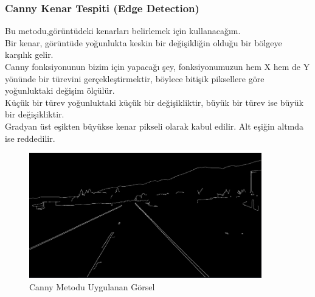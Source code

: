 \documentclass{article}
\begin{document}
\subsubsection{Canny Kenar Tespiti (Edge Detection)}
Bu metodu,görüntüdeki kenarları belirlemek için kullanacağım.\\[2pt]
Bir kenar, görüntüde yoğunlukta keskin bir değişikliğin olduğu bir bölgeye karşılık gelir.\\[2pt]
Canny fonksiyonunun bizim için yapacağı şey, fonksiyonumuzun hem X hem de Y yönünde bir türevini gerçekleştirmektir, böylece bitişik piksellere göre yoğunluktaki değişim ölçülür.\\[2pt]
Küçük bir türev yoğunluktaki küçük bir değişikliktir, büyük bir türev ise büyük bir değişikliktir.\\[2pt]
Gradyan üst eşikten büyükse kenar pikseli olarak kabul edilir. Alt eşiğin altında ise reddedilir.\\[5pt]
\begin{figure}[h]
  \centering
  \includegraphics[width=0.9\textwidth]{image/Resim23.png} %
  \caption{Canny Metodu Uygulanan Görsel}
  \label{fig:python21}  
\end{figure}
\end{document}
